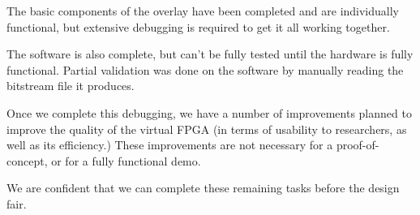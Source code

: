 
The basic components of the overlay have been completed and are individually functional, but extensive debugging is required to get it all working together.

The software is also complete, but can't be fully tested until the hardware is fully functional.
Partial validation was done on the software by manually reading the bitstream file it produces.

Once we complete this debugging, we have a number of improvements planned to improve the quality of the virtual FPGA (in terms of usability to researchers, as well as its efficiency.)
These improvements are not necessary for a proof-of-concept, or for a fully functional demo.

We are confident that we can complete these remaining tasks before the design fair.



